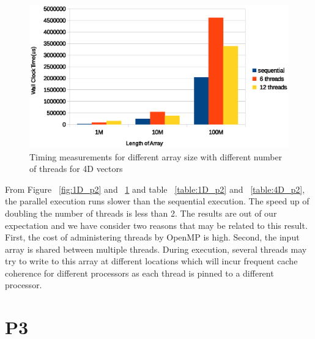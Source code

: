 \documentclass{article}
\begin{document}
\begin{figure}[!htb]
  \centering
  \includegraphics[width=\textwidth]{fig/4D_p2}
  \caption{Timing measurements for different array size with different
    number of threads for 4D vectors}
  \label{fig:4D_p2}
\end{figure}

\FloatBarrier

From Figure ~\ref{fig:1D_p2} and ~\ref{fig:4D_p2} and
table ~\ref{table:1D_p2} and ~\ref{table:4D_p2}, the parallel execution runs
slower than the sequential execution. The speed up of doubling the
number of threads is less than 2. The results are out of our
expectation and we have consider two reasons that may be related to
this result. First, the cost of administering threads by OpenMP is
high. Second, the input array is shared between multiple threads. 
During execution, several threads may try to write to this array at
different locations which will incur
frequent cache coherence for different processors as each thread is pinned
to a different processor.  

\section{P3}
\end{document}
